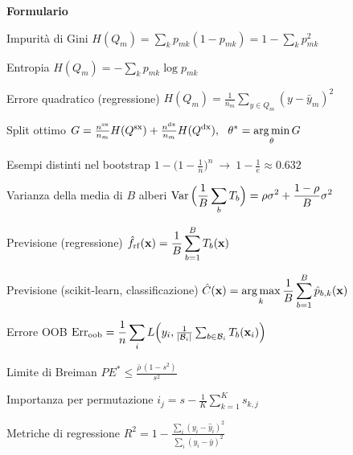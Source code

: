 \clearpage
{}
{\headfont\bfseries\Huge\color{navy}Formulario\par}
\vspace{4pt}{\color{teal}\rule{3cm}{2.5pt}}\vspace{6pt}

\begin{tcbraster}[raster columns=2,raster equal height=rows,raster column skip=10pt,raster row skip=8pt]
\begin{formulat}{Impurità di Gini}
$\displaystyle H(Q_m)=\sum_k p_{mk}(1-p_{mk})=1-\sum_k p_{mk}^2$
\end{formulat}
\begin{formulat}{Entropia}
$\displaystyle H(Q_m)=-\sum_k p_{mk}\log p_{mk}$
\end{formulat}
\begin{formulat}{Errore quadratico (regressione)}
$\displaystyle H(Q_m)=\frac1{n_m}\sum_{y\in Q_m}(y-\bar y_m)^2$
\end{formulat}
\begin{formulat}{Split ottimo}
$\displaystyle G=\tfrac{n^{\mathrm{sx}}}{n_m}H(Q^{\mathrm{sx}})+\tfrac{n^{\mathrm{dx}}}{n_m}H(Q^{\mathrm{dx}}),\ \ \theta^*=\argmin_\theta G$
\end{formulat}
\begin{formulat}{Esempi distinti nel bootstrap}
$\displaystyle 1-\Big(1-\frac1n\Big)^{n}\ \to\ 1-\frac1e\approx0.632$
\end{formulat}
\begin{formulat}{Varianza della media di $B$ alberi}
$\displaystyle \operatorname{Var}\Big(\frac1B\sum_b T_b\Big)=\rho\sigma^2+\frac{1-\rho}{B}\sigma^2$
\end{formulat}
\begin{formulat}{Previsione (regressione)}
$\displaystyle \hat f_{\mathrm{rf}}(\mathbf{x})=\frac1B\sum_{b=1}^B T_b(\mathbf{x})$
\end{formulat}
\begin{formulat}{Previsione (scikit-learn, classificazione)}
$\displaystyle \hat C(\mathbf{x})=\operatorname*{arg\,max}_k\frac1B\sum_{b=1}^B\hat p_{b,k}(\mathbf{x})$
\end{formulat}
\begin{formulat}{Errore OOB}
$\displaystyle \mathrm{Err}_{\mathrm{oob}}=\frac1n\sum_i L\Big(y_i,\tfrac{1}{|\mathcal B_i|}\textstyle\sum_{b\in\mathcal B_i}T_b(\mathbf{x}_i)\Big)$
\end{formulat}
\begin{formulat}{Limite di Breiman}
$\displaystyle PE^*\le\frac{\bar\rho\,(1-s^2)}{s^2}$
\end{formulat}
\begin{formulat}{Importanza per permutazione}
$\displaystyle i_j=s-\frac1K\sum_{k=1}^K s_{k,j}$
\end{formulat}
\begin{formulat}{Metriche di regressione}
$\displaystyle R^2=1-\frac{\sum_i(y_i-\hat y_i)^2}{\sum_i(y_i-\bar y)^2}$
\end{formulat}
\end{tcbraster}

